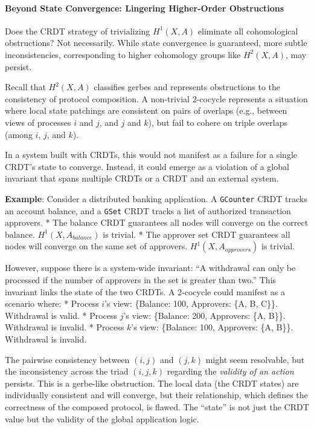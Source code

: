 \documentclass[
]{article}
\begin{document}
\paragraph{Beyond State Convergence: Lingering Higher-Order
Obstructions}\label{beyond-state-convergence-lingering-higher-order-obstructions}

Does the CRDT strategy of trivializing \(H^1(X, A)\) eliminate all
cohomological obstructions? Not necessarily. While state convergence is
guaranteed, more subtle inconsistencies, corresponding to higher
cohomology groups like \(H^2(X, A)\), may persist.

Recall that \(H^2(X, A)\) classifies gerbes and represents obstructions
to the consistency of protocol composition. A non-trivial 2-cocycle
represents a situation where local state patchings are consistent on
pairs of overlaps (e.g., between views of processes \(i\) and \(j\), and
\(j\) and \(k\)), but fail to cohere on triple overlaps (among \(i\),
\(j\), and \(k\)).

In a system built with CRDTs, this would not manifest as a failure for a
single CRDT's state to converge. Instead, it could emerge as a violation
of a global invariant that spans multiple CRDTs or a CRDT and an
external system.

\textbf{Example}: Consider a distributed banking application. A
\texttt{GCounter} CRDT tracks an account balance, and a \texttt{GSet}
CRDT tracks a list of authorized transaction approvers. * The balance
CRDT guarantees all nodes will converge on the correct balance.
\(H^1(X, A_{balance})\) is trivial. * The approver set CRDT guarantees
all nodes will converge on the same set of approvers.
\(H^1(X, A_{approvers})\) is trivial.

However, suppose there is a system-wide invariant: ``A withdrawal can
only be processed if the number of approvers in the set is greater than
two.'' This invariant links the state of the two CRDTs. A 2-cocycle
could manifest as a scenario where: * Process \(i\)'s view: \{Balance:
100, Approvers: \{A, B, C\}\}. Withdrawal is valid. * Process \(j\)'s
view: \{Balance: 200, Approvers: \{A, B\}\}. Withdrawal is invalid. *
Process \(k\)'s view: \{Balance: 100, Approvers: \{A, B\}\}. Withdrawal
is invalid.

The pairwise consistency between \((i, j)\) and \((j, k)\) might seem
resolvable, but the inconsistency across the triad \((i, j, k)\)
regarding the \emph{validity of an action} persists. This is a
gerbe-like obstruction. The local data (the CRDT states) are
individually consistent and will converge, but their relationship, which
defines the correctness of the composed protocol, is flawed. The
``state'' is not just the CRDT value but the validity of the global
application logic.
\end{document}
